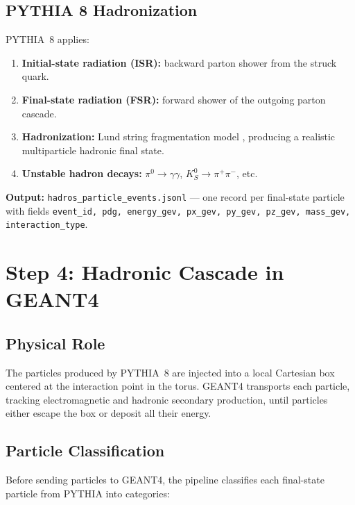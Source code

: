 \documentclass[11pt,a4paper]{article}
\begin{document}
\subsection{PYTHIA 8 Hadronization}

PYTHIA~8 \cite{Sjostrand2014} applies:
\begin{enumerate}
  \item \textbf{Initial-state radiation (ISR):} backward parton shower from the struck quark.
  \item \textbf{Final-state radiation (FSR):} forward shower of the outgoing parton cascade.
  \item \textbf{Hadronization:} Lund string fragmentation model \cite{Andersson1983}, producing a realistic multiparticle hadronic final state.
  \item \textbf{Unstable hadron decays:} $\pi^0 \to \gamma\gamma$, $K_S^0 \to \pi^+\pi^-$, etc.
\end{enumerate}

\textbf{Output:} \texttt{hadros\_particle\_events.jsonl} --- one record per final-state particle with fields \texttt{event\_id, pdg, energy\_gev, px\_gev, py\_gev, pz\_gev, mass\_gev, interaction\_type}.

\section{Step 4: Hadronic Cascade in GEANT4}
\label{sec:geant4}

\subsection{Physical Role}

The particles produced by PYTHIA~8 are injected into a local Cartesian box centered at the interaction point in the torus. GEANT4 \cite{Agostinelli2003, Allison2006} transports each particle, tracking electromagnetic and hadronic secondary production, until particles either escape the box or deposit all their energy.

\subsection{Particle Classification}

Before sending particles to GEANT4, the pipeline classifies each final-state particle from PYTHIA into categories:
\end{document}
